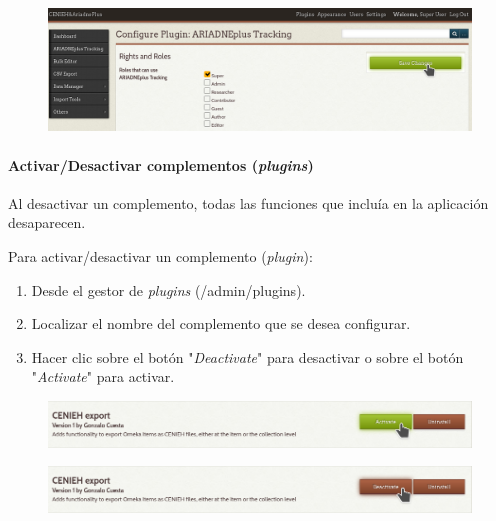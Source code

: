 \documentclass[
]{article}
\providecommand{\tightlist}{%
  \setlength{\itemsep}{0pt}\setlength{\parskip}{0pt}}
\begin{document}
\begin{figure}
\hypertarget{plugins-conf-2}{%
\centering
\includegraphics{../_static/images/plugins-conf-2.png}
\caption{}\label{plugins-conf-2}
}
\end{figure}

\hypertarget{activardesactivar-complementos-plugins}{%
\paragraph{\texorpdfstring{Activar/Desactivar complementos
(\emph{plugins})}{Activar/Desactivar complementos (plugins)}}\label{activardesactivar-complementos-plugins}}

Al desactivar un complemento, todas las funciones que incluía en la
aplicación desaparecen.

Para activar/desactivar un complemento (\emph{plugin}):

\begin{enumerate}
\def\labelenumi{\arabic{enumi}.}
\tightlist
\item
  Desde el gestor de \emph{plugins} ({/admin/plugins}).
\item
  Localizar el nombre del complemento que se desea configurar.
\item
  Hacer clic sobre el botón "\emph{Deactivate}" para desactivar o sobre
  el botón "\emph{Activate}" para activar.
\end{enumerate}

\begin{figure}
\hypertarget{plugins-act}{%
\centering
\includegraphics{../_static/images/plugins-act.png}
\caption{}\label{plugins-act}
}
\end{figure}

\begin{figure}
\hypertarget{plugins-des}{%
\centering
\includegraphics{../_static/images/plugins-des.png}
\caption{}\label{plugins-des}
}
\end{figure}
\end{document}
